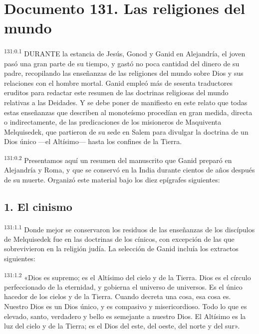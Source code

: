 \chapter{Documento 131. Las religiones del mundo}
\par 
\textsuperscript{131:0.1} DURANTE la estancia de Jesús, Gonod y Ganid en Alejandría, el joven pasó una gran parte de su tiempo, y gastó no poca cantidad del dinero de su padre, recopilando las enseñanzas de las religiones del mundo sobre Dios y sus relaciones con el hombre mortal. Ganid empleó más de sesenta traductores eruditos para redactar este resumen de las doctrinas religiosas del mundo relativas a las Deidades. Y se debe poner de manifiesto en este relato que todas estas enseñanzas que describen al monoteísmo procedían en gran medida, directa o indirectamente, de las predicaciones de los misioneros de Maquiventa Melquisedek, que partieron de su sede en Salem para divulgar la doctrina de un Dios único ---el Altísimo--- hasta los confines de la Tierra.

\par 
\textsuperscript{131:0.2} Presentamos aquí un resumen del manuscrito que Ganid preparó en Alejandría y Roma, y que se conservó en la India durante cientos de años después de su muerte. Organizó este material bajo los diez epígrafes siguientes:

\section*{1. El cinismo}
\par 
\textsuperscript{131:1.1} Donde mejor se conservaron los residuos de las enseñanzas de los discípulos de Melquisedek fue en las doctrinas de los cínicos, con excepción de las que sobrevivieron en la religión judía. La selección de Ganid incluía los extractos siguientes:

\par 
\textsuperscript{131:1.2} «Dios es supremo; es el Altísimo del cielo y de la Tierra. Dios es el círculo perfeccionado de la eternidad, y gobierna el universo de universos. Es el único hacedor de los cielos y de la Tierra. Cuando decreta una cosa, esa cosa es. Nuestro Dios es un Dios único, y es compasivo y misericordioso. Todo lo que es elevado, santo, verdadero y bello es semejante a nuestro Dios. El Altísimo es la luz del cielo y de la Tierra; es el Dios del este, del oeste, del norte y del sur».

